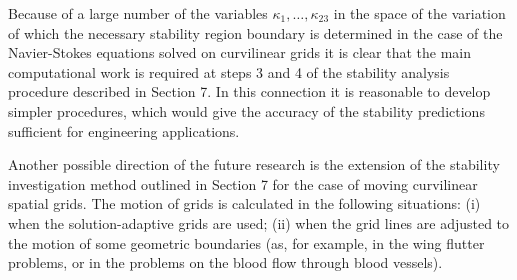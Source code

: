    Because of a large number of the variables $\kappa_1,\ldots,\kappa_{23}$ in
the space of the variation of which the necessary stability region boundary is
determined in the case of the Navier-Stokes equations solved on curvilinear
grids it is clear that the main computational work is required at steps 3 and
4 of the stability analysis procedure described in Section 7. In this
connection it is reasonable to develop simpler procedures, which would give
the accuracy of the stability predictions sufficient for engineering
applications.

   Another possible direction of the future research is the extension of the
stability investigation method outlined in Section 7 for the case of moving
curvilinear spatial grids. The motion of grids is calculated in the following
situations: (i) when the solution-adaptive grids are used; (ii) when the grid
lines are adjusted to the motion of some geometric boundaries (as, for
example, in the wing flutter problems, or in the problems on the blood flow
through blood vessels).

